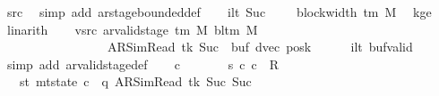 \begin{isabellebody}
\ src{}\ \isamarkupfalse%
\ {\isacharparenleft}{\kern0pt}simp\ add{\isacharcolon}{\kern0pt}\ ar{\isacharunderscore}{\kern0pt}stage{\isacharunderscore}{\kern0pt}bounded{\isacharunderscore}{\kern0pt}def{\isacharparenright}{\kern0pt}\isanewline
\ \ \isamarkupfalse%
\ i{}lt{\isacharcolon}{\kern0pt}\ {\isachardoublequoteopen}Suc\ {}\ {\isacharless}{\kern0pt}\ {}\ {\isacharasterisk}{\kern0pt}\ block{\isacharunderscore}{\kern0pt}width\ {\isacharparenleft}{\kern0pt}{\isasymGamma}{\isacharunderscore}{\kern0pt}tm\ M{\isacharparenright}{\kern0pt}{\isachardoublequoteclose}\ \isamarkupfalse%
\ kge{}\ \isamarkupfalse%
\ linarith\isanewline
\ \ \isamarkupfalse%
\ vsrc{}{\isacharcolon}{\kern0pt}\ {\isachardoublequoteopen}ar{\isacharunderscore}{\kern0pt}valid{\isacharunderscore}{\kern0pt}stage\ {\isacharparenleft}{\kern0pt}{\isasymGamma}{\isacharunderscore}{\kern0pt}tm\ M{\isacharparenright}{\kern0pt}\ {\isacharparenleft}{\kern0pt}bl{\isacharunderscore}{\kern0pt}tm\ M{\isacharparenright}{\kern0pt}\isanewline
\ \ \ \ \ \ \ \ \ \ \ \ \ \ \ \ \ {\isacharparenleft}{\kern0pt}AR{\isacharunderscore}{\kern0pt}SimRead{\isacharcomma}{\kern0pt}\ tk{\isacharcomma}{\kern0pt}\ Suc\ {}{\isacharcomma}{\kern0pt}\ buf{\isacharcomma}{\kern0pt}\ dvec{\isacharcomma}{\kern0pt}\ posk{\isacharparenright}{\kern0pt}{\isachardoublequoteclose}\isanewline
\ \ \ \ \isamarkupfalse%
\ i{}lt\ buf{\isacharunderscore}{\kern0pt}valid\ \isamarkupfalse%
\ {\isacharparenleft}{\kern0pt}simp\ add{\isacharcolon}{\kern0pt}\ ar{\isacharunderscore}{\kern0pt}valid{\isacharunderscore}{\kern0pt}stage{\isacharunderscore}{\kern0pt}def{\isacharparenright}{\kern0pt}\isanewline
\ \ \isamarkupfalse%
\ c{}\ \isanewline
\ \ \ \ \ \ s{}{\isacharcolon}{\kern0pt}\ {\isachardoublequoteopen}{\isacharparenleft}{\kern0pt}c{}{\isacharcomma}{\kern0pt}\ c{}{\isacharparenright}{\kern0pt}\ {\isasymin}\ R{\isacharprime}{\kern0pt}{\isachardoublequoteclose}\isanewline
\ \ \ st{}{\isacharcolon}{\kern0pt}\ {\isachardoublequoteopen}mt{\isacharunderscore}{\kern0pt}state\ c{}\ {\isacharequal}{\kern0pt}\ {\isacharparenleft}{\kern0pt}q{\isacharcomma}{\kern0pt}\ AR{\isacharunderscore}{\kern0pt}SimRead{\isacharcomma}{\kern0pt}\ tk{\isacharcomma}{\kern0pt}\ Suc\ {\isacharparenleft}{\kern0pt}Suc\ {}{\isacharparenright}{\kern0pt}{\isacharcomma}{\kern0pt}\isanewline

\end{isabellebody}
